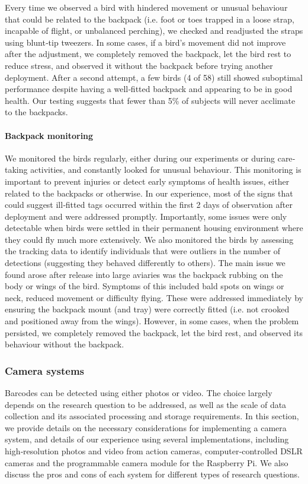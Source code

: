 \documentclass[11pt,a4paper,oneside]{article}
\begin{document}
Every time we observed a bird with hindered movement or unusual behaviour that could be related to the backpack (i.e. foot or toes trapped in a loose strap, incapable of flight, or unbalanced perching), we checked and readjusted the straps using blunt‐tip tweezers. In some cases, if a bird's movement did not improve after the adjustment, we completely removed the backpack, let the bird rest to reduce stress, and observed it without the backpack before trying another deployment. After a second attempt, a few birds (4 of 58) still showed suboptimal performance despite having a well‐fitted backpack and appearing to be in good health. Our testing suggests that fewer than 5\% of subjects will never acclimate to the backpacks.

\paragraph{Backpack monitoring}
We monitored the birds regularly, either during our experiments or during care‐taking activities, and constantly looked for unusual behaviour. This monitoring is important to prevent injuries or detect early symptoms of health issues, either related to the backpacks or otherwise. In our experience, most of the signs that could suggest ill‐fitted tags occurred within the first 2 days of observation after deployment and were addressed promptly. Importantly, some issues were only detectable when birds were settled in their permanent housing environment where they could fly much more extensively. We also monitored the birds by assessing the tracking data to identify individuals that were outliers in the number of detections (suggesting they behaved differently to others). The main issue we found arose after release into large aviaries was the backpack rubbing on the body or wings of the bird. Symptoms of this included bald spots on wings or neck, reduced movement or difficulty flying. These were addressed immediately by ensuring the backpack mount (and tray) were correctly fitted (i.e. not crooked and positioned away from the wings). However, in some cases, when the problem persisted, we completely removed the backpack, let the bird rest, and observed its behaviour without the backpack.

\subsubsection{Camera systems}
Barcodes can be detected using either photos or video. The choice largely depends on the research question to be addressed, as well as the scale of data collection and its associated processing and storage requirements. In this section, we provide details on the necessary considerations for implementing a camera system, and details of our experience using several implementations, including high‐resolution photos and video from action cameras, computer‐controlled DSLR cameras and the programmable camera module for the Raspberry Pi. We also discuss the pros and cons of each system for different types of research questions.
\end{document}
